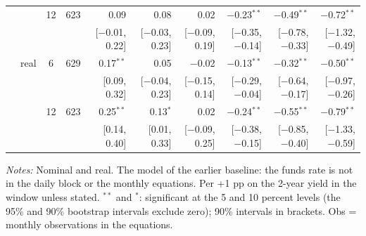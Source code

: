\begin{longtable}{llcrrrrrrr}
 &  & 12 & 623 & 0.09 & 0.08 & 0.02 & $-$0.23$^{**}$ & $-$0.49$^{**}$ & $-$0.72$^{**}$\\
 & & & & {\scriptsize [$-$0.01, 0.22]} & {\scriptsize [$-$0.03, 0.23]} & {\scriptsize [$-$0.09, 0.19]} & {\scriptsize [$-$0.35, $-$0.14]} & {\scriptsize [$-$0.78, $-$0.33]} & {\scriptsize [$-$1.32, $-$0.49]}\\
 & real & 6 & 629 & 0.17$^{**}$ & 0.05 & $-$0.02 & $-$0.13$^{**}$ & $-$0.32$^{**}$ & $-$0.50$^{**}$\\
 & & & & {\scriptsize [0.09, 0.32]} & {\scriptsize [$-$0.04, 0.23]} & {\scriptsize [$-$0.15, 0.14]} & {\scriptsize [$-$0.29, $-$0.04]} & {\scriptsize [$-$0.64, $-$0.17]} & {\scriptsize [$-$0.97, $-$0.26]}\\
 &  & 12 & 623 & 0.25$^{**}$ & 0.13$^{*}$ & 0.02 & $-$0.24$^{**}$ & $-$0.55$^{**}$ & $-$0.79$^{**}$\\
 & & & & {\scriptsize [0.14, 0.40]} & {\scriptsize [0.01, 0.33]} & {\scriptsize [$-$0.09, 0.25]} & {\scriptsize [$-$0.38, $-$0.15]} & {\scriptsize [$-$0.85, $-$0.40]} & {\scriptsize [$-$1.33, $-$0.59]}\\
\end{longtable}
\begin{flushleft}\footnotesize\textit{Notes:} Nominal and real. The model of the earlier baseline: the funds rate is not in the daily block or the monthly equations. Per +1 pp on the 2-year yield in the window unless stated. $^{**}$ and $^{*}$: significant at the 5 and 10 percent levels (the 95\% and 90\% bootstrap intervals exclude zero); 90\% intervals in brackets. Obs = monthly observations in the equations.\end{flushleft}
\endgroup
